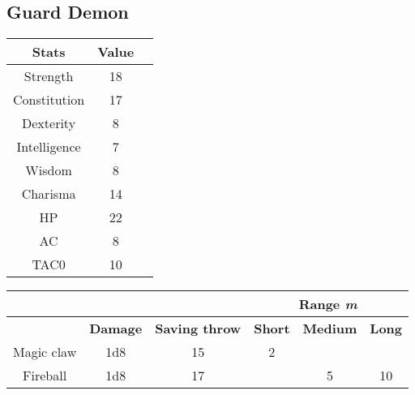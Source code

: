 \subsection{Guard Demon}
\begin{table}[H]
  \centering
\begin{tabular}{|c|c|c|}
\hline
\rowcolor[HTML]{C0C0C0} 
\textbf{Stats} & \textbf{Value } \\ \hline
Strength & 18  \\ \hline
Constitution & 17  \\ \hline
Dexterity & 8  \\ \hline
Intelligence & 7 \\ \hline
Wisdom & 8  \\ \hline
Charisma & 14  \\ \hline
HP & 22  \\ \hline
AC & 8 \\ \hline
TAC0 & 10 \\ \hline
\end{tabular}
\end{table}
\begin{table}[H]
\centering
 \begin{tabular}{lll|c|c|c|}
\cline{4-6}
 &  & & \multicolumn{3}{c|}{\cellcolor[HTML]{C0C0C0}\textbf{Range \textit{m}}} \\ \hline
\rowcolor[HTML]{C0C0C0} 
\multicolumn{1}{|l|}{\cellcolor[HTML]{C0C0C0}\textbf{Weapon}} & \textbf{Damage} & \textbf{Saving throw}&\multicolumn{1}{l|}{\cellcolor[HTML]{C0C0C0}\textbf{Short}} & \textbf{Medium} & \textbf{Long} \\ \hline
\multicolumn{1}{|c|}{Magic claw} & \multicolumn{1}{c|}{1d8} & \multicolumn{1}{c|}{15} & 2 &  &  \\ \hline
\multicolumn{1}{|c|}{Fireball} & \multicolumn{1}{c|}{1d8} & \multicolumn{1}{c|}{17}   &  & 5 & 10 \\ \hline
\end{tabular}
  \end{table}
